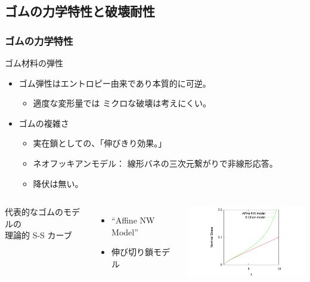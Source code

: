\documentclass[11pt, dvipdfmx]{beamer}
\begin{document}
\subsection{ゴムの力学特性と破壊耐性}


\begin{frame}
\frametitle{ゴムの力学特性}

\begin{block}{ゴム材料の弾性}
	\begin{itemize}
	\item ゴム弾性はエントロピー由来であり{\color{red}本質的に可逆}。
	\begin{itemize}
		\item 適度な変形量では{\color{red} ミクロな破壊は考えにくい。}
	\end{itemize}
	\item 
	ゴムの複雑さ
	\begin{itemize}
		\item
		実在鎖としての、{\color{red}「伸びきり効果。」}
		\item ネオフッキアンモデル：
		線形バネの三次元繋がりで{\color{blue}非線形応答}。
		\item {\color{red} 降伏は無い。}
	\end{itemize}
	\end{itemize}
\end{block}

\begin{columns}[totalwidth=1\textwidth]
代表的なゴムのモデルの\\理論的 S-S カーブ
\begin{itemize}
\item
``Affine NW Model''
\item
伸び切り鎖モデル
\end{itemize}
\centering
\includegraphics[width=60mm]{./fig/4_Chain.pdf}
\end{columns}

\end{frame}
\end{document}
